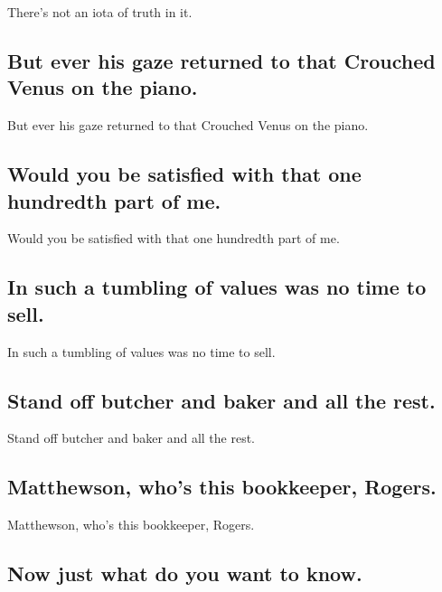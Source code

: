 \documentclass[]{article}
\begin{document}
There's not an iota of truth in it.

\hypertarget{but-ever-his-gaze-returned-to-that-crouched-venus-on-the-piano.}{%
\subsection{But ever his gaze returned to that Crouched Venus on the
piano.}\label{but-ever-his-gaze-returned-to-that-crouched-venus-on-the-piano.}}

But ever his gaze returned to that Crouched Venus on the piano.

\hypertarget{would-you-be-satisfied-with-that-one-hundredth-part-of-me.}{%
\subsection{Would you be satisfied with that one hundredth part of
me.}\label{would-you-be-satisfied-with-that-one-hundredth-part-of-me.}}

Would you be satisfied with that one hundredth part of me.

\hypertarget{in-such-a-tumbling-of-values-was-no-time-to-sell.}{%
\subsection{In such a tumbling of values was no time to
sell.}\label{in-such-a-tumbling-of-values-was-no-time-to-sell.}}

In such a tumbling of values was no time to sell.

\hypertarget{stand-off-butcher-and-baker-and-all-the-rest.}{%
\subsection{Stand off butcher and baker and all the
rest.}\label{stand-off-butcher-and-baker-and-all-the-rest.}}

Stand off butcher and baker and all the rest.

\hypertarget{matthewson-whos-this-bookkeeper-rogers.}{%
\subsection{Matthewson, who's this bookkeeper,
Rogers.}\label{matthewson-whos-this-bookkeeper-rogers.}}

Matthewson, who's this bookkeeper, Rogers.

\hypertarget{now-just-what-do-you-want-to-know.}{%
\subsection{Now just what do you want to
know.}\label{now-just-what-do-you-want-to-know.}}
\end{document}
